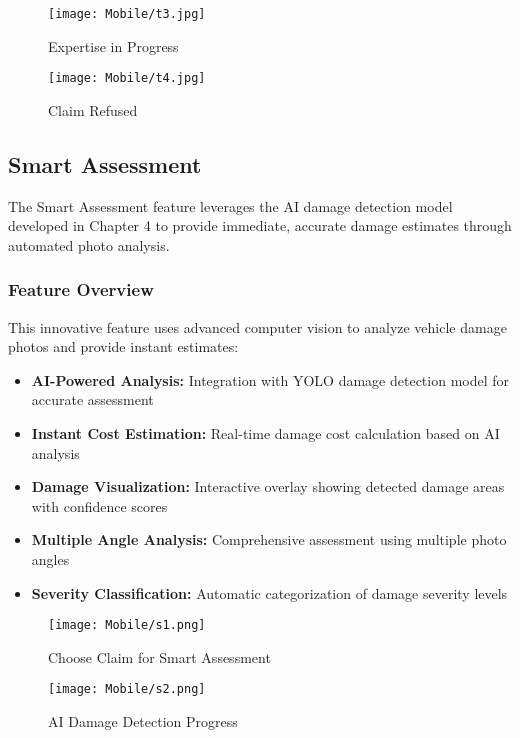 \documentclass[12pt,a4paper]{report}
\begin{document}
\begin{figure}[H]
    \centering
    \begin{minipage}{0.45\textwidth}
        \centering
        \texttt{[image: Mobile/t3.jpg]}
        \caption{Expertise in Progress}
        \label{fig:track_claims3}
    \end{minipage}
    \hfill
    \begin{minipage}{0.45\textwidth}
        \centering
        \texttt{[image: Mobile/t4.jpg]}
        \caption{Claim Refused}
        \label{fig:track_claims4}
    \end{minipage}
\end{figure}

\subsection{Smart Assessment}

The Smart Assessment feature leverages the AI damage detection model developed in Chapter 4 to provide immediate, accurate damage estimates through automated photo analysis.

\subsubsection{Feature Overview}

This innovative feature uses advanced computer vision to analyze vehicle damage photos and provide instant estimates:

\begin{itemize}
    \item \textbf{AI-Powered Analysis:} Integration with YOLO damage detection model for accurate assessment
    \item \textbf{Instant Cost Estimation:} Real-time damage cost calculation based on AI analysis
    \item \textbf{Damage Visualization:} Interactive overlay showing detected damage areas with confidence scores
    \item \textbf{Multiple Angle Analysis:} Comprehensive assessment using multiple photo angles
    \item \textbf{Severity Classification:} Automatic categorization of damage severity levels

\end{itemize}

\begin{figure}[H]
    \centering
    \begin{minipage}{0.45\textwidth}
        \centering
        \texttt{[image: Mobile/s1.png]}
        \caption{Choose Claim for Smart Assessment}
        \label{fig:smart_assessment1}
    \end{minipage}
    \hfill
    \begin{minipage}{0.45\textwidth}
        \centering
        \texttt{[image: Mobile/s2.png]}
        \caption{AI Damage Detection Progress}
        \label{fig:smart_assessment2}
    \end{minipage}
\end{figure}
\end{document}
